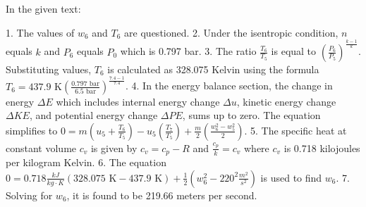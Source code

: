In the given text:

1. The values of \( w_6 \) and \( T_6 \) are questioned.
2. Under the isentropic condition, \( n \) equals \( k \) and \( P_6 \) equals \( P_0 \) which is 0.797 bar.
3. The ratio \( \frac{T_6}{T_5} \) is equal to \( \left( \frac{P_6}{P_5} \right)^{\frac{k-1}{k}} \). Substituting values, \( T_6 \) is calculated as 328.075 Kelvin using the formula \( T_6 = 437.9 \text{ K} \left( \frac{0.797 \text{ bar}}{6.5 \text{ bar}} \right)^{\frac{7.4-1}{7.4}} \).
4. In the energy balance section, the change in energy \( \Delta E \) which includes internal energy change \( \Delta u \), kinetic energy change \( \Delta KE \), and potential energy change \( \Delta PE \), sums up to zero. The equation simplifies to \( 0 = m \left( u_5 + \frac{T_6}{T_5} \right) - u_5 \left( \frac{T_7}{T_5} \right) + \frac{m}{2} \left( \frac{w_6^2 - w_5^2}{2} \right) \).
5. The specific heat at constant volume \( c_v \) is given by \( c_v = c_p - R \) and \( \frac{c_p}{k} = c_v \) where \( c_v \) is 0.718 kilojoules per kilogram Kelvin.
6. The equation \( 0 = 0.718 \frac{kJ}{kg \cdot K} \left( 328.075 \text{ K} - 437.9 \text{ K} \right) + \frac{1}{2} \left( w_6^2 - 220^2 \frac{m^2}{s^2} \right) \) is used to find \( w_6 \).
7. Solving for \( w_6 \), it is found to be 219.66 meters per second.